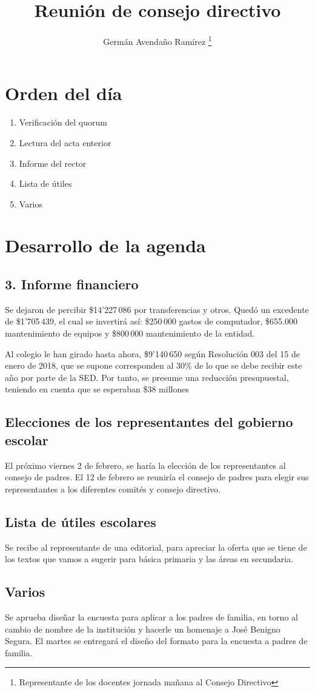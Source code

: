 \documentclass[10pt,letterpaper]{article}
\author{Germán Avendaño Ramírez \thanks{Representante de los docentes jornada mañana al Consejo Directivo}}
\title{Reunión de consejo directivo}
\begin{document}
\maketitle
\section*{Orden del día}
\begin{enumerate}
\item Verificación del quorum
\item Lectura del acta enterior
\item Informe del rector
\item Lista de útiles
\item Varios
\end{enumerate}
\section*{Desarrollo de la agenda}
\subsection*{3. Informe financiero}
Se dejaron de percibir \$14'227\,086 por transferencias y otros. Quedó un excedente de \$1'705\,439, el cual se invertirá así: \$250\,000 gastos de computador, \$655.000 mantenimiento de equipos y \$800\,000 mantenimiento de la entidad.

Al colegio le han girado hasta ahora, \$9'140\,650 según Resolución 003 del 15 de enero de 2018, que se supone corresponden al 30\% de lo que se debe recibir este año por parte de la SED. Por tanto, se presume una reducción presupuestal, teniendo en cuenta que se esperaban \$38 millones
\subsection*{Elecciones de los representantes del gobierno escolar}
El próximo viernes 2 de febrero, se haría la elección de los representantes al consejo de padres. El 12 de febrero se reuniría el consejo de padres para elegir sus representantes a los diferentes comités y consejo directivo.
\subsection*{Lista de útiles escolares}
Se recibe al representante de una editorial, para apreciar la oferta que se tiene de los textos que vamos a sugerir para básica primaria y las áreas en secundaria.
\subsection*{Varios}
Se aprueba diseñar la encuesta para aplicar a los padres de familia, en torno al cambio de nombre de la institución y hacerle un homenaje a José Benigno Segura. El martes se entregará el diseño del formato para la encuesta a padres de familia.
\end{document}
